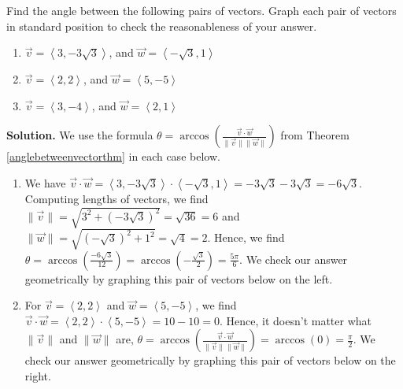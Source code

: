\documentclass{ximera}
\begin{document}
\begin{ex} \label{anglebetweenvectorex}  Find the angle between the following pairs of vectors.  Graph each pair of vectors in standard position to check the reasonableness of your answer.
\begin{enumerate}

\item  \label{anglebetweenvectorexone} $\vec{v} = \left< 3, -3\sqrt{3} \right>$, and $\vec{w} = \left<-\sqrt{3}, 1 \right>$

\item  \label{anglebetweenvectorextwo} $\vec{v} = \left< 2, 2 \right>$, and $\vec{w} = \left<5, -5\right>$

\item \label{anglebetweenvectorexthree} $\vec{v} = \left< 3, -4 \right>$, and $\vec{w} = \left<2, 1\right>$

\end{enumerate}


{\bf Solution.}  We use the formula $\theta = \arccos\left( \frac{\vec{v} \cdot \vec{w}}{\| \vec{v} \| \|\vec{w} \|}\right)$ from Theorem \ref{anglebetweenvectorthm} in each case below.

\begin{enumerate}

\item  We have $\vec{v} \cdot \vec{w} = \left< 3, -3\sqrt{3} \right> \cdot \left<-\sqrt{3}, 1 \right> = -3\sqrt{3} - 3\sqrt{3} = -6\sqrt{3}$.  Computing lengths of vectors, we find  $\| \vec{v} \| = \sqrt{3^2+(-3\sqrt{3})^2} = \sqrt{36} =6$ and $\| \vec{w}\| = \sqrt{(-\sqrt{3})^2+1^2} = \sqrt{4} =2$.  Hence,  we find $\theta = \arccos\left(\frac{-6\sqrt{3}}{12}\right) = \arccos\left(-\frac{\sqrt{3}}{2}\right) = \frac{5\pi}{6}$.  We check our answer geometrically by graphing this pair of vectors below on the left.

\item  For $\vec{v} = \left< 2, 2 \right>$  and $\vec{w} = \left<5, -5\right>$, we find $\vec{v} \cdot \vec{w} = \left< 2, 2 \right> \cdot \left<5, -5\right> = 10-10 = 0$.  Hence, it doesn't matter what $\| \vec{v} \|$ and $\| \vec{w} \|$ are,  $\theta = \arccos\left( \frac{\vec{v} \cdot \vec{w}}{\| \vec{v} \| \|\vec{w} \|}\right) = \arccos(0) = \frac{\pi}{2}$.  We check our answer geometrically by graphing this pair of vectors below on the right.

\begin{center}

\begin{multicols}{2}


\end{multicols}
\end{center}
\end{enumerate}
\end{ex}
\end{document}

